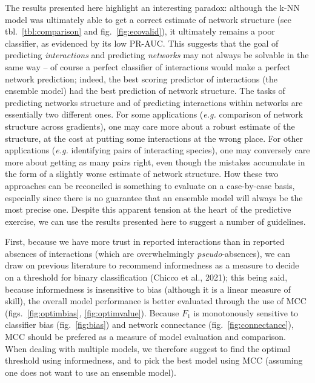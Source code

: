 \documentclass[11pt]{article}
\begin{document}
The results presented here highlight an interesting paradox: although
the k-NN model was ultimately able to get a correct estimate of network
structure (see tbl.~\ref{tbl:comparison} and fig.~\ref{fig:ecovalid}),
it ultimately remains a poor classifier, as evidenced by its low PR-AUC.
This suggests that the goal of predicting \emph{interactions} and
predicting \emph{networks} may not always be solvable in the same way --
of course a perfect classifier of interactions would make a perfect
network prediction; indeed, the best scoring predictor of interactions
(the ensemble model) had the best prediction of network structure. The
tasks of predicting networks structure and of predicting interactions
within networks are essentially two different ones. For some
applications (\emph{e.g.} comparison of network structure across
gradients), one may care more about a robust estimate of the structure,
at the cost at putting some interactions at the wrong place. For other
applications (\emph{e.g.} identifying pairs of interacting species), one
may conversely care more about getting as many pairs right, even though
the mistakes accumulate in the form of a slightly worse estimate of
network structure. How these two approaches can be reconciled is
something to evaluate on a case-by-case basis, especially since there is
no guarantee that an ensemble model will always be the most precise one.
Despite this apparent tension at the heart of the predictive exercise,
we can use the results presented here to suggest a number of guidelines.

First, because we have more trust in reported interactions than in
reported absences of interactions (which are overwhelmingly
\emph{pseudo}-absences), we can draw on previous literature to recommend
informedness as a measure to decide on a threshold for binary
classification (Chicco et al., 2021); this being said, because
informedness is insensitive to bias (although it is a linear measure of
skill), the overall model performance is better evaluated through the
use of MCC (figs.~\ref{fig:optimbias}, \ref{fig:optimvalue}). Because
\(F_1\) is monotonously sensitive to classifier bias
(fig.~\ref{fig:bias}) and network connectance
(fig.~\ref{fig:connectance}), MCC should be prefered as a measure of
model evaluation and comparison. When dealing with multiple models, we
therefore suggest to find the optimal threshold using informedness, and
to pick the best model using MCC (assuming one does not want to use an
ensemble model).
\end{document}
